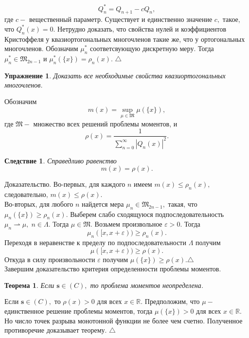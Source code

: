 \documentclass[12pt,a4paper]{article}
\theoremstyle{plain}   \newtheorem{Pro}{Задача}
\newtheorem{The}{Теорема}
\newtheorem{Cor}{Следствие}
\newtheorem{Exe}{Упражнение}
\begin{document}
$$
  Q_n ^{\ast} = Q_{n+1}-cQ_n ,
$$
где
$ c - $
вещественный параметр. Существует и единственно значение
$ c , $
такое, что
$ Q_n ^{\ast} (x)=0. $
Нетрудно доказать, что свойства нулей и коэффициентов Кристоффеля
у квазиортогональных многочленов такие же, что у ортогональных
многочленов. Обозначим
$ \mu _n ^{\ast} $
соответсвующую дискретную меру. Тогда
$ \mu _n ^{\ast} \in \mathfrak{M}_{2n-1} $
и
$ \mu _n ^{\ast} (\{x \} ) = \rho _n (x) . $
$ \triangle $
\begin{Exe}
Доказать все необходимые свойства квазиортогональных многочленов.
\end{Exe}
Обозначим
$$
  m(x)=\sup _{\mu \in \mathfrak{M}} \mu ( \{ x \} ) ,
$$
где
$ \mathfrak{M} - $
множество всех решений проблемы моментов, и
$$
  \rho (x) = \frac{1}{\sum _{n=0}^{\infty}
  |Q_n (x)|^2 } .
$$
\begin{Cor}
Справедливо равенство
$$
  m(x)=\rho (x) .
$$
\end{Cor}
{\Large Доказательство.}
Во-первых, для каждого $ n $ имеем
$  m(x) \leq \rho _n (x) , $
следовательно,
$ m(x) \leq \rho (x) . $
\\
Во-вторых, для любого $ n $ найдется мера
$ \mu _n \in \mathfrak{M}_{2n-1} , $
такая, что
$ \mu _n (\{ x \} ) \geq \rho _n (x) . $
Выберем слабо сходящуюся подпоследовательность
$ \mu _n \rightharpoonup \mu , \; n \in \Lambda . $
Тогда
$ \mu \in \mathfrak{M} . $
Возьмем произвольное
$ \varepsilon >0 . $
Тогда
$$
  \mu _n ([x,x+\varepsilon )) \geq \rho _n (x).
$$
Переходя в неравенстве к пределу по подпоследовательности
$ \Lambda $
получим
$$
  \mu ([x,x+\varepsilon)) \geq \rho (x) .
$$
Откуда в силу произвольности
$ \varepsilon $
получим
$ \mu ( \{ x \} ) \geq \rho (x) . \triangle $
\\

Завершим доказательство критерия определенности проблемы моментов.
\begin{The}
Если
$ \mathbf{s} \in (C), $
то проблема моментов неопределена.
\end{The}
Если
$ \mathbf{s} \in (C) , $
то
$ \rho (x)>0 $
для всех
$ x \in \mathbb{R} . $
Предположим, что
$ \mu - $
единственное решение проблемы моментов, тогда
$ \mu ( \{ x \} ) >0 $
для всех
$ x \in \mathbb{R} . $
Но число точек разрыва монотонной функции не более чем счетно.
Полученное противоречие доказывает теорему.
$ \triangle $
\newpage
\end{document}
